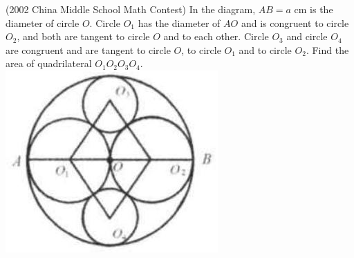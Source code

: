 \documentclass{article}
\begin{document}
(2002 China Middle School Math Contest) In the diagram, \(A B=a\) cm is the diameter of circle \(O\). Circle \(O_{1}\) has the diameter of \(A O\) and is congruent to circle \(O_{2}\), and both are tangent to circle \(O\) and to each other. Circle \(O_{3}\) and circle \(O_{4}\) are congruent and are tangent to circle \(O\), to circle \(O_{1}\) and to circle \(O_{2}\). Find the area of quadrilateral \(O_{1} O_{2} O_{3} O_{4}\).\\
\centering
\includegraphics[width=\textwidth]{images/182.jpg}
\end{document}
